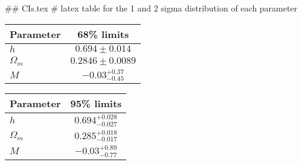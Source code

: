 ## CIs.tex
# latex table for the 1 and 2 sigma distribution of each parameter

\begin{tabular} { l  c}
 Parameter &  68\% limits\\
\hline
{\boldmath$h              $} & $0.694\pm 0.014            $\\
{\boldmath$\Omega_m       $} & $0.2846\pm 0.0089          $\\
{\boldmath$M              $} & $-0.03^{+0.37}_{-0.45}     $\\
\hline
\end{tabular}

\begin{tabular} { l  c}
 Parameter &  95\% limits\\
\hline
{\boldmath$h              $} & $0.694^{+0.028}_{-0.027}   $\\
{\boldmath$\Omega_m       $} & $0.285^{+0.018}_{-0.017}   $\\
{\boldmath$M              $} & $-0.03^{+0.89}_{-0.77}     $\\
\hline
\end{tabular}
